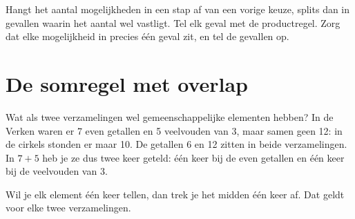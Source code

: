 \begin{werkwijze}
Hangt het aantal mogelijkheden in een stap af van een vorige keuze, splits dan in gevallen waarin het aantal wel vastligt. Tel elk geval met de productregel. Zorg dat elke mogelijkheid in precies één geval zit, en tel de gevallen op.
\end{werkwijze}

\begin{oefeningen}
\end{oefeningen}

\section{De somregel met overlap}

Wat als twee verzamelingen wel gemeenschappelijke elementen hebben? In de Verken waren er 7 even getallen en 5 veelvouden van 3, maar samen geen 12: in de cirkels stonden er maar 10. De getallen 6 en 12 zitten in beide verzamelingen. In $7 + 5$ heb je ze dus twee keer geteld: één keer bij de even getallen en één keer bij de veelvouden van 3.


Wil je elk element één keer tellen, dan trek je het midden één keer af. Dat geldt voor elke twee verzamelingen.

